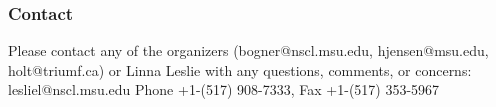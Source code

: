 \documentclass{beamer}
\begin{document}
\begin{frame}
\frametitle{Contact}

\begin{block}{}
Please contact any of the organizers (bogner@nscl.msu.edu, hjensen@msu.edu, holt@triumf.ca) or Linna Leslie with any questions, comments, or concerns:
lesliel@nscl.msu.edu Phone +1-(517) 908-7333, Fax +1-(517) 353-5967 

\end{block}
\end{frame}
\end{document}
